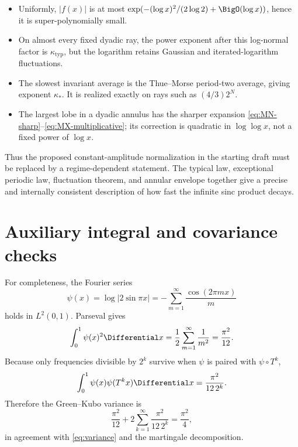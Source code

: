 \documentclass[11pt,oneside]{article}
\theoremstyle{definition}
\theoremstyle{remark}
\newcommand{\T}{T}
\begin{document}
\begin{itemize}
\item Uniformly, $|f(x)|$ is at most
      $\exp(-(\log x)^2/(2\log2)+\BigO(\log x))$, hence it is
      super-polynomially small.
\item On almost every fixed dyadic ray, the power exponent after this
      log-normal factor is $\kappa_{\mathrm{typ}}$, but the logarithm retains
      Gaussian and iterated-logarithm fluctuations.
\item The slowest invariant average is the Thue--Morse period-two average,
      giving exponent $\kappa_*$.  It is realized exactly on rays such as
      $(4/3)2^N$.
\item The largest lobe in a dyadic annulus has the sharper expansion
      \eqref{eq:MN-sharp}--\eqref{eq:MX-multiplicative}; its correction is
      quadratic in $\log\log x$, not a fixed power of $\log x$.
\end{itemize}

Thus the proposed constant-amplitude normalization in the starting draft must
be replaced by a regime-dependent statement.  The typical law, exceptional
periodic law, fluctuation theorem, and annular envelope together give a precise
and internally consistent description of how fast the infinite sinc product
decays.

\appendix

\section{Auxiliary integral and covariance checks}

For completeness, the Fourier series
\begin{equation}
 \psi(x)=\log|2\sin\pi x|
 =-\sum_{m=1}^{\infty}\frac{\cos(2\pi mx)}{m}              \label{eq:psi-fourier}
\end{equation}
holds in $L^2(0,1)$.  Parseval gives
\begin{equation}
 \int_0^1\psi(x)^2\Differential x=\frac12\sum_{m=1}^{\infty}\frac1{m^2}
 =\frac{\pi^2}{12}.                                        \label{eq:psi-var}
\end{equation}
Because only frequencies divisible by $2^k$ survive when
$\psi$ is paired with $\psi\circ\T^k$,
\begin{equation}
 \int_0^1\psi(x)\psi(\T^kx)\Differential x
 =\frac{\pi^2}{12\,2^k}.                                  \label{eq:covariance}
\end{equation}
Therefore the Green--Kubo variance is
\begin{equation}
 \frac{\pi^2}{12}
 +2\sum_{k=1}^{\infty}\frac{\pi^2}{12\,2^k}
 =\frac{\pi^2}{4},                                         \label{eq:green-kubo}
\end{equation}
in agreement with \eqref{eq:variance} and the martingale decomposition.
\end{document}

